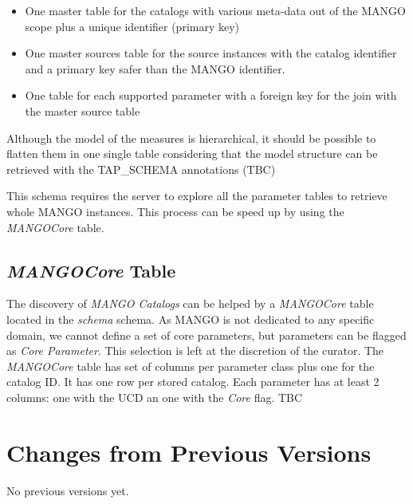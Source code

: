 \documentclass[11pt,a4paper]{ivoa}
\begin{document}
\begin{itemize}
  \item One master table for the catalogs with various meta-data out of the MANGO scope plus a unique identifier (primary key)
  \item One master sources table for the source instances with the catalog identifier and a primary key safer than the MANGO identifier.
  \item One table for each supported parameter with a foreign key for the join with the master source table
\end{itemize}

Although the model of the measures is hierarchical, it should be possible to flatten them in one single table considering that the model structure can be retrieved with the TAP\_SCHEMA annotations (TBC)

This schema requires the server to explore all the parameter tables to retrieve  whole MANGO instances. This process can be speed up by using the \emph{MANGOCore} table.

\subsection{ \emph{MANGOCore} Table}

The discovery of \emph{MANGO Catalogs} can be helped by a  \emph{MANGOCore} table located in the  \emph{schema} schema. As MANGO is not dedicated to any specific domain, we cannot define a set of core parameters, but parameters can be flagged as \emph{Core Parameter}. This selection is left at the discretion of the curator.
The \emph{MANGOCore} table has set of columns per parameter class plus one for the catalog ID. It has one row per stored catalog. Each parameter has at least 2 columns: one with the UCD an one with the \emph{Core} flag. TBC


\appendix
\section{Changes from Previous Versions}

No previous versions yet.



\end{document}
